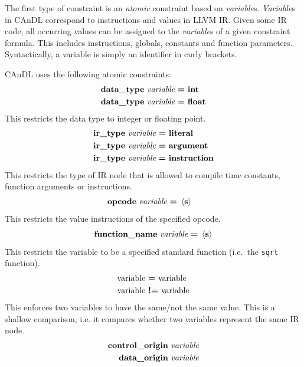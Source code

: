     The first type of constraint is an {\it atomic} constraint based on
    {\it variable}s.
    {\it Variable}s in CAnDL correspond to instructions and values in LLVM IR. 
    Given some IR code, all occurring values can be assigned to the
    {\it variable}s of a given constraint formula.
    This includes instructions, globals, constants and function parameters.
    Syntactically, a variable is simply an identifier in curly brackets.

    CAnDL uses the following atomic constraints:
    \begin{align*}
        \text{\bf data\_type}\ \text{\it variable}\ &\text{\bf =}\ \text{\bf int}\\
        \text{\bf data\_type}\ \text{\it variable}\ &\text{\bf =}\ \text{\bf float}
    \end{align*}
    This restricts the data type to integer or floating point.
    \begin{align*}
        \text{\bf ir\_type}\ \text{\it variable}\ &\text{\bf =}\ \text{\bf literal}\\
        \text{\bf ir\_type}\ \text{\it variable}\ &\text{\bf =}\ \text{\bf argument}\\
        \text{\bf ir\_type}\ \text{\it variable}\ &\text{\bf =}\ \text{\bf instruction}
    \end{align*}
    This restricts the type of IR node that is allowed to compile time constants, function arguments or instructions.
    \begin{align*}
        \text{\bf opcode}\ \text{\it variable}\ &\text{\bf =}\ \left<\text{\bf s}\right>
    \end{align*}
    This restricts the value instructions of the specified opcode.
    \begin{align*}
        \text{\bf function\_name}\ \text{\it variable}\ \text{\bf =}\ \left<\text{\bf s}\right>
    \end{align*}
    This restricts the variable to be a specified standard function (i.e.\ the {\tt sqrt} function).
    \begin{align*}
        \text{variable}\ &\text{\bf =}\ \text{variable}\\
        \text{variable}\ &\text{\bf !=}\ \text{variable}
    \end{align*}
    This enforces two variables to have the same/not the same value.
    This is a shallow comparison, i.e. it compares whether two variables represent the same IR node. 
    \begin{align*}
        \text{\bf control\_origin}&\ \text{\it variable}\\
        \text{\bf data\_origin}&\ \text{\it variable}
    \end{align*}
